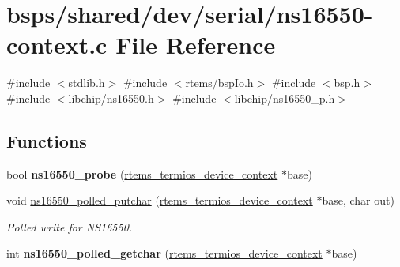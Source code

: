 \hypertarget{ns16550-context_8c}{}\section{bsps/shared/dev/serial/ns16550-\/context.c File Reference}
\label{ns16550-context_8c}
{\ttfamily \#include $<$stdlib.\+h$>$}\newline
{\ttfamily \#include $<$rtems/bsp\+Io.\+h$>$}\newline
{\ttfamily \#include $<$bsp.\+h$>$}\newline
{\ttfamily \#include $<$libchip/ns16550.\+h$>$}\newline
{\ttfamily \#include $<$libchip/ns16550\+\_\+p.\+h$>$}\newline
\subsection*{Functions}
\begin{DoxyCompactItemize}
\item 
\mbox{\label{ns16550-context_8c_a399e94659149b71bbcd51b54b2e2a8a1}} 
bool {\bfseries ns16550\+\_\+probe} (\mbox{\hyperlink{structrtems__termios__device__context}{rtems\+\_\+termios\+\_\+device\+\_\+context}} $\ast$base)
\item 
\mbox{\label{ns16550-context_8c_aeecfbdb95bf85a2961673be4e3bba832}} 
void \mbox{\hyperlink{ns16550-context_8c_aeecfbdb95bf85a2961673be4e3bba832}{ns16550\+\_\+polled\+\_\+putchar}} (\mbox{\hyperlink{structrtems__termios__device__context}{rtems\+\_\+termios\+\_\+device\+\_\+context}} $\ast$base, char out)
\begin{DoxyCompactList}\small\item\em Polled write for N\+S16550. \end{DoxyCompactList}\item 
\mbox{\label{ns16550-context_8c_ac48542ca657ac7cb578cac5ea39e7a1e}} 
int {\bfseries ns16550\+\_\+polled\+\_\+getchar} (\mbox{\hyperlink{structrtems__termios__device__context}{rtems\+\_\+termios\+\_\+device\+\_\+context}} $\ast$base)
\end{DoxyCompactItemize}
